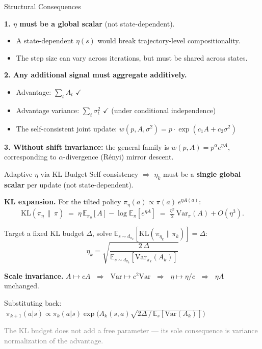 \documentclass[aspectratio=169,11pt]{beamer}
\newcommand{\E}{\mathbb{E}}
\newcommand{\KL}{\mathrm{KL}}
\newcommand{\Var}{\mathrm{Var}}
\begin{document}
\begin{frame}{Structural Consequences}

\textbf{1. $\eta$ must be a global scalar} (not state-dependent).
\begin{itemize}
  \item A state-dependent $\eta(s)$ would break trajectory-level compositionality.
  \item The step size can vary across iterations, but must be shared across states.
\end{itemize}

\pause
\medskip
\textbf{2. Any additional signal must aggregate additively.}
\begin{itemize}
  \item Advantage: $\sum_t A_t$ $\checkmark$
  \item Advantage variance: $\sum_t \sigma^2_t$ $\checkmark$ (under conditional independence)
  \item The self-consistent joint update: $w(p, A, \sigma^2) = p \cdot \exp(c_1 A + c_2 \sigma^2)$
\end{itemize}

\pause
\medskip
\textbf{3. Without shift invariance:} the general family is $w(p,A) = p^\alpha e^{\eta A}$, corresponding to $\alpha$-divergence (R\'enyi) mirror descent.
\end{frame}

\begin{frame}{Adaptive $\eta$ via KL Budget}
\smallskip
Self-consistency $\Rightarrow$ $\eta_k$ must be a \textbf{single global scalar} per update (not state-dependent).

\pause
\medskip
\textbf{KL expansion.}\; For the tilted policy $\pi_\eta(a)\propto \pi(a)\,e^{\eta A(a)}$:
\vspace{-0.15cm}
\[
  \KL(\pi_\eta\,\|\,\pi)
  \;=\; \eta\,\E_{\pi_\eta}[A] - \log\E_\pi[e^{\eta A}]
  \;=\; \tfrac{\eta^2}{2}\,\Var_\pi(A) + O(\eta^3).
\]
\vspace{-0.3cm}

\pause
Target a fixed KL budget $\Delta$, solve $\E_{s \sim d_{\pi_k}}[\KL(\pi_{\eta_k}\|\pi_k)]=\Delta$:
\vspace{-0.1cm}
\[
  \boxed{\;\eta_k = \sqrt{\frac{2\,\Delta}{\E_{s \sim d_{\pi_k}}[\Var_{\pi_k}(A_k)]}}\;}
\]
\vspace{-0.3cm}

\pause
\textbf{Scale invariance.}\; $A\mapsto cA$ $\;\Rightarrow\;$ $\Var\mapsto c^2\Var$ $\;\Rightarrow\;$ $\eta\mapsto\eta/c$ $\;\Rightarrow\;$ $\eta A$ unchanged.

\pause
\medskip
Substituting back: $\;\pi_{k+1}(a|s) \propto \pi_k(a|s)\exp\!\Big(A_k(s,a)\sqrt{2\Delta\, /\, \E_s[\Var(A_k)]}\Big)$

\smallskip
\small\textcolor{gray}{The KL budget does not add a free parameter --- its sole consequence is variance normalization of the advantage.}
\end{frame}
\end{document}
